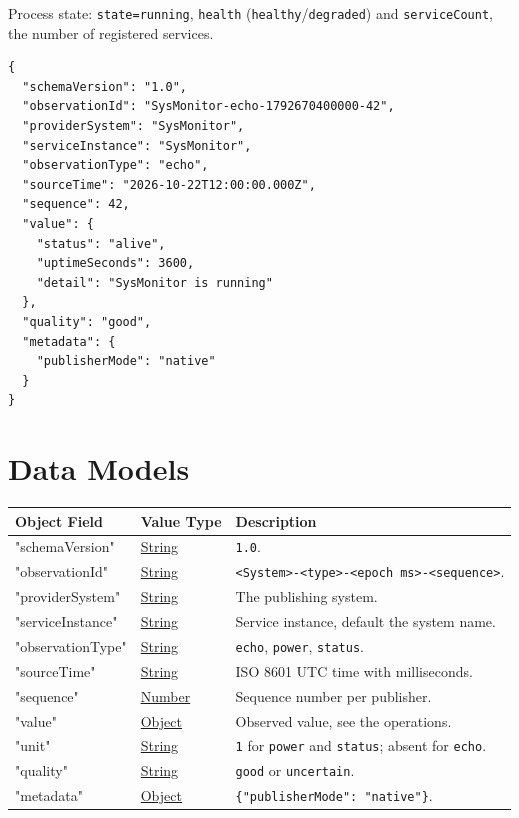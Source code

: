 \documentclass[a4paper]{arrowhead}
\newcommand{\oref}[1]{{\textcolor{ArrowheadBlue}{\hyperref[sec:operations:#1]{#1}}}}
\newcommand{\pref}[1]{{\textcolor{ArrowheadGrey}{\hyperref[sec:model:primitives:#1]{#1}}}}
\begin{document}
Process state: \texttt{state=\allowbreak{}running}, \texttt{health} (\texttt{healthy}/\texttt{degraded}) and \texttt{serviceCount}, the number of registered services.

\begin{lstlisting}[caption={An \oref{echo} observation.}]
{
  "schemaVersion": "1.0",
  "observationId": "SysMonitor-echo-1792670400000-42",
  "providerSystem": "SysMonitor",
  "serviceInstance": "SysMonitor",
  "observationType": "echo",
  "sourceTime": "2026-10-22T12:00:00.000Z",
  "sequence": 42,
  "value": {
    "status": "alive",
    "uptimeSeconds": 3600,
    "detail": "SysMonitor is running"
  },
  "quality": "good",
  "metadata": {
    "publisherMode": "native"
  }
}
\end{lstlisting}

\newpage

\section{Data Models}
\label{sec:model}


\noindent\begin{tabularx}{\textwidth}{| p{4.25cm} | p{3.5cm} | X |} \hline
\rowcolor{gray!33} Object Field & Value Type & Description \\ \hline
"schemaVersion" & \pref{String} & \texttt{1.0}. \\ \hline
"observationId" & \pref{String} & \texttt{<System>-<type>-<epoch ms>-<sequence>}. \\ \hline
"providerSystem" & \pref{String} & The publishing system. \\ \hline
"serviceInstance" & \pref{String} & Service instance, default the system name. \\ \hline
"observationType" & \pref{String} & \texttt{echo}, \texttt{power}, \texttt{status}. \\ \hline
"sourceTime" & \pref{String} & ISO 8601 UTC time with milliseconds. \\ \hline
"sequence" & \pref{Number} & Sequence number per publisher. \\ \hline
"value" & \pref{Object} & Observed value, see the operations. \\ \hline
"unit" & \pref{String} & \texttt{1} for \texttt{power} and \texttt{status}; absent for \texttt{echo}. \\ \hline
"quality" & \pref{String} & \texttt{good} or \texttt{uncertain}. \\ \hline
"metadata" & \pref{Object} & \texttt{\{"publisherMode": "native"\}}. \\ \hline
\end{tabularx}
\end{document}
